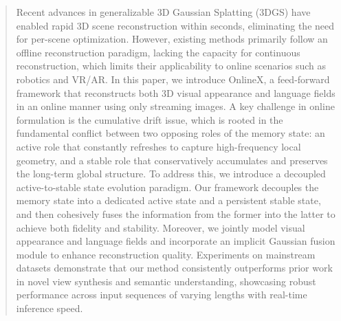 

\begin{abstract}
Recent advances in generalizable 3D Gaussian Splatting (3DGS) have enabled rapid 3D scene reconstruction within seconds, eliminating the need for per-scene optimization. However, existing methods primarily  follow an offline reconstruction paradigm, lacking the capacity for continuous reconstruction, which limits their applicability to online scenarios such as robotics and VR/AR. In this paper, we introduce OnlineX, a feed-forward framework that reconstructs both 3D visual appearance and language fields in an online manner using only streaming images. A key challenge in online formulation is the cumulative drift issue, which is rooted in the fundamental conflict between two opposing roles of the memory state: an active role that constantly refreshes to capture high-frequency local geometry, and a stable role that conservatively accumulates and preserves the long-term global structure. To address this, we introduce a decoupled active-to-stable state evolution paradigm. Our framework decouples the memory state into a dedicated active state and a persistent stable state, and then cohesively fuses the information from the former into the latter to achieve both fidelity and stability. Moreover, we jointly model visual appearance and language fields and incorporate an implicit Gaussian fusion module to enhance reconstruction quality. Experiments on mainstream datasets demonstrate that our method consistently outperforms prior work in novel view synthesis and semantic understanding, showcasing robust performance across input sequences of varying lengths with real-time inference speed.

\end{abstract}
